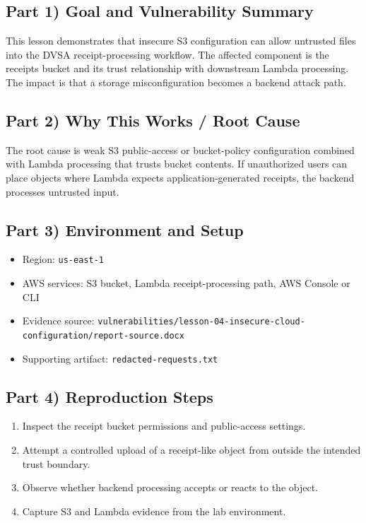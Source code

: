 \documentclass[12pt]{article}
\begin{document}
\subsection*{Part 1) Goal and Vulnerability Summary}
This lesson demonstrates that insecure S3 configuration can allow untrusted files into the DVSA receipt-processing workflow. The affected component is the receipts bucket and its trust relationship with downstream Lambda processing. The impact is that a storage misconfiguration becomes a backend attack path.

\subsection*{Part 2) Why This Works / Root Cause}
The root cause is weak S3 public-access or bucket-policy configuration combined with Lambda processing that trusts bucket contents. If unauthorized users can place objects where Lambda expects application-generated receipts, the backend processes untrusted input.

\subsection*{Part 3) Environment and Setup}
\begin{itemize}
\item Region: \texttt{us-east-1}
\item AWS services: S3 bucket, Lambda receipt-processing path, AWS Console or CLI
\item Evidence source: \texttt{vulnerabilities/lesson-04-insecure-cloud-configuration/report-source.docx}
\item Supporting artifact: \texttt{redacted-requests.txt}
\end{itemize}

\subsection*{Part 4) Reproduction Steps}
\begin{enumerate}
\item Inspect the receipt bucket permissions and public-access settings.
\item Attempt a controlled upload of a receipt-like object from outside the intended trust boundary.
\item Observe whether backend processing accepts or reacts to the object.
\item Capture S3 and Lambda evidence from the lab environment.
\end{enumerate}
\end{document}
